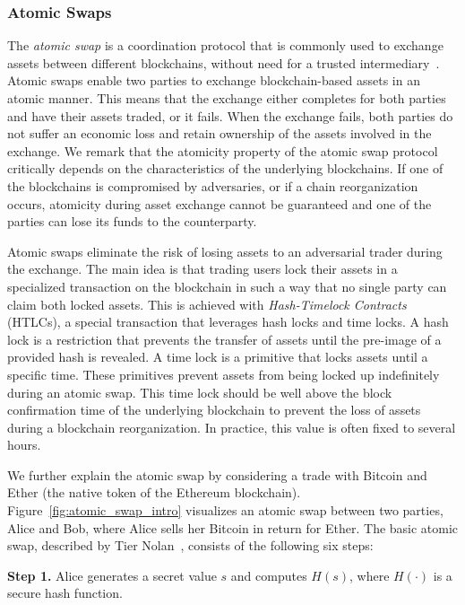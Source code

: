 \subsubsection{Atomic Swaps}
\label{sec:intro_atomic_swaps}
The \emph{atomic swap} is a coordination protocol that is commonly used to exchange assets between different blockchains, without need for a trusted intermediary~\cite{herlihy2018atomic}.
Atomic swaps enable two parties to exchange blockchain-based assets in an atomic manner.
This means that the exchange either completes for both parties and have their assets traded, or it fails.
When the exchange fails, both parties do not suffer an economic loss and retain ownership of the assets involved in the exchange.
We remark that the atomicity property of the atomic swap protocol critically depends on the characteristics of the underlying blockchains.
If one of the blockchains is compromised by adversaries, or if a chain reorganization occurs, atomicity during asset exchange cannot be guaranteed and one of the parties can lose its funds to the counterparty.

Atomic swaps eliminate the risk of losing assets to an adversarial trader during the exchange.
The main idea is that trading users lock their assets in a specialized transaction on the blockchain in such a way that no single party can claim both locked assets.
This is achieved with \emph{Hash-Timelock Contracts} (HTLCs), a special transaction that leverages hash locks and time locks.
A hash lock is a restriction that prevents the transfer of assets until the pre-image of a provided hash is revealed.
A time lock is a primitive that locks assets until a specific time.
These primitives prevent assets from being locked up indefinitely during an atomic swap.
This time lock should be well above the block confirmation time of the underlying blockchain to prevent the loss of assets during a blockchain reorganization.
In practice, this value is often fixed to several hours.

We further explain the atomic swap by considering a trade with Bitcoin and Ether (the native token of the Ethereum blockchain).
Figure~\ref{fig:atomic_swap_intro} visualizes an atomic swap between two parties, Alice and Bob, where Alice sells her Bitcoin in return for Ether.
The basic atomic swap, described by Tier Nolan~\cite{nolan2016atomic}, consists of the following six steps:

\textbf{Step 1.} Alice generates a secret value $ s $ and computes $ H(s) $, where $ H(\cdot) $ is a secure hash function.

